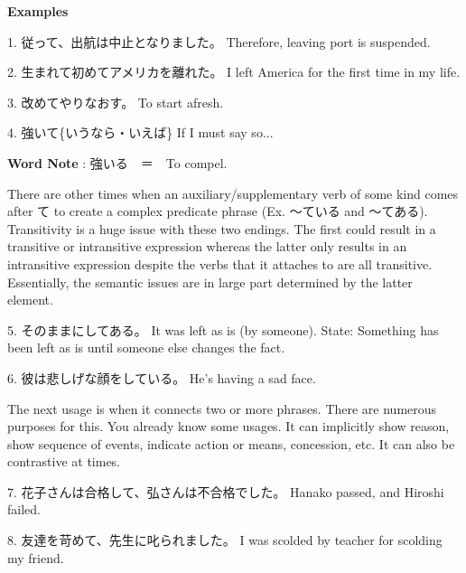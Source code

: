 \begin{center}
 \textbf{Examples }
\end{center}

\par{1. 従って、出航は中止となりました。 \hfill\break
Therefore, leaving port is suspended. }

\par{2. 生まれて初めてアメリカを離れた。 \hfill\break
I left America for the first time in my life. }

\par{3. 改めてやりなおす。 \hfill\break
To start afresh. }

\par{4. 強いて\{いうなら・いえば\} \hfill\break
If I must say so\dothyp{}\dothyp{}\dothyp{} }

\par{\textbf{Word Note }: 強いる　＝　To compel. }

\par{ There are other times when an auxiliary\slash supplementary verb of some kind comes after て to create a complex predicate phrase (Ex. ～ている and ～てある). Transitivity is a huge issue with these two endings. The first could result in a transitive or intransitive expression whereas the latter only results in an intransitive expression despite the verbs that it attaches to are all transitive. Essentially, the semantic issues are in large part determined by the latter element. }

\par{5. そのままにしてある。 \hfill\break
It was left as is (by someone). \hfill\break
State: Something has been left as is until someone else changes the fact. }
 
\par{6. 彼は悲しげな顔をしている。 \hfill\break
He's having a sad face. }

\par{ The next usage is when it connects two or more phrases. There are numerous purposes for this. You already know some usages. It can implicitly show reason, show sequence of events, indicate action or means, concession, etc. It can also be contrastive at times. }

\par{7. 花子さんは合格して、弘さんは不合格でした。 \hfill\break
Hanako passed, and Hiroshi failed. }

\par{8. 友達を苛めて、先生に叱られました。 \hfill\break
I was scolded by teacher for scolding my friend. }

